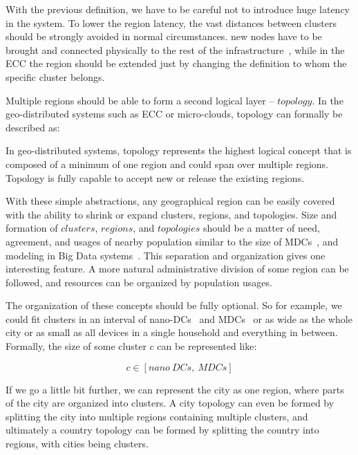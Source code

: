 With the previous definition, we have to be careful not to introduce huge latency in the system. To lower the region latency, the vast distances between clusters should be strongly avoided in normal circumstances. new nodes have to be brought and connected physically to the rest of the infrastructure~\cite{Hamilton07}, while in the ECC the region should be extended just by changing the definition to whom the specific cluster belongs.

Multiple regions should be able to form a second logical layer -- $topology$. In the geo-distributed systems such as ECC or micro-clouds, topology can formally be described as:

\begin{definition}
In geo-distributed systems, topology represents the highest logical concept that is composed of a minimum of one region and could span over multiple regions. Topology is fully capable to accept new or release the existing regions. 
\end{definition}

With these simple abstractions, any geographical region can be easily covered with the ability to shrink or expand clusters, regions, and topologies. Size and formation of $clusters$, $regions$, and $topologies$ should be a matter of need, agreement, and usages of nearby population similar to the size of MDCs~\cite{GreenbergHMP09}, and modeling in Big Data systems~\cite{SonbolOAA20, WangCAL14}. This separation and organization gives one interesting feature. A more natural administrative division of some region can be followed, and resources can be organized by population usages.

The organization of these concepts should be fully optional. So for example, we could fit clusters in an interval of nano-DCs~\cite{inbookKurniawan} and MDCs~\cite{GreenbergHMP09} or as wide as the whole city or as small as all devices in a single household and everything in between. Formally, the size of some cluster $c$ can be represented like:

\begin{equation}
	c \in \left[ nano\ DCs,\ MDCs \right]
\end{equation}

\noindent
If we go a little bit further, we can represent the city as one region, where parts of the city are organized into clusters. A city topology can even be formed by splitting the city into multiple regions containing multiple clusters, and ultimately a country topology can be formed by splitting the country into regions, with cities being clusters.\\ 

